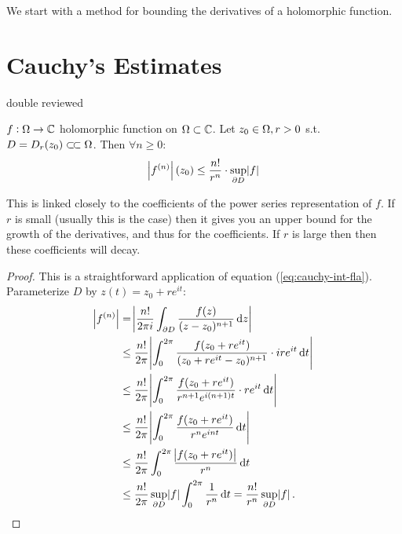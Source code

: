 \setcounter{section}{0}
\setcounter{theorem}{0}


We start with a method for bounding the derivatives of a holomorphic function.

\section{Cauchy's Estimates}

double reviewed


\begin{theorem}\label{thm:cauchy-estimates}

$f:\Omega \rightarrow \mathbb{C}$ holomorphic function on $\Omega \subset \mathbb{C}$. Let $z_0 \in \Omega, r>0 $ s.t. $D=D_r(z_0) \ssubset \om$. Then $\forall n\geq 0$:  
\begin{align*}
    \abs{f^{(n)}}(z_0) \leq \frac{n!}{r^n} \cdot \sup_{\partial D}\abs{f}
\end{align*}

\end{theorem}


\begin{note}
This is linked closely to the coefficients of the power series representation of $f$. If $r$ is small (usually this is the case) then it gives you an upper bound for the growth of the derivatives, and thus for the coefficients. If $r$ is large then then these coefficients will decay.
\end{note}


\begin{proof}
This is a straightforward application of equation (\ref{eq:cauchy-int-fla}). Parameterize $D$ by $z(t) = z_0 +re^{it}$:
\begin{align*}
    \abs{f^{(n)}} &= \abs{\frac{n!}{2\pi i} \int_{\partial D} \frac{f(z)}{(z-z_0)^{n+1}} \dif z }\\
    &\leq \frac{n!}{2\pi} \abs{\int_{0}^{2\pi} \frac{f(z_0 +re^{it})}{(z_0 +re^{it}-z_0)^{n+1}} \cdot i r e^{it} \dif t }\\
    &\leq \frac{n!}{2\pi} \abs{\int_{0}^{2\pi} \frac{f(z_0 +re^{it})}{r^{n+1}e^{i(n+1)t}} \cdot r e^{it} \dif t }\\
    &\leq  \frac{n!}{2\pi} \abs{\int_{0}^{2\pi} \frac{f(z_0 +re^{it})}{r^{n}e^{int}} \dif t }\\
    &\leq \frac{n!}{2\pi} \int_{0}^{2\pi}  \frac{\abs{ f(z_0 +re^{it})  }}{r^{n}} \dif t \\
    &\leq \frac{n!}{2\pi} \sup_{\partial D}\abs{f} \int_{0}^{2\pi}  \frac{1}{r^{n}} \dif t  = \frac{n!}{r^n} \sup_{\partial D}\abs{f}.
\end{align*}
\end{proof}

